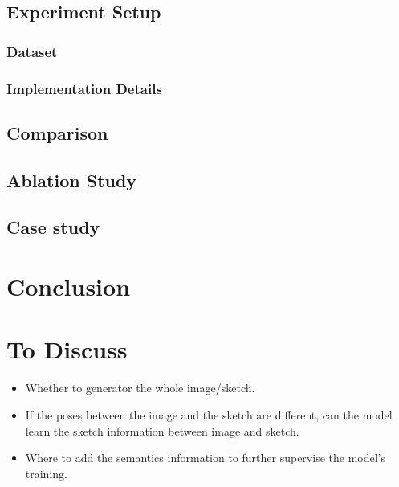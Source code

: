 \documentclass[10pt,twocolumn,letterpaper]{article}
\begin{document}
\subsection{Experiment Setup}

\subsubsection{Dataset}

\subsubsection{Implementation Details}

\subsection{Comparison}

\subsection{Ablation Study}

\subsection{Case study}

\section{Conclusion}

\section{To Discuss}
\begin{itemize}
	\item Whether to generator the whole image/sketch.
	\item If the poses between the image and the sketch are different, can the model learn the sketch information between image and sketch.
	\item Where to add the semantics information to further supervise the model's training.
\end{itemize}


{\small


}
\end{document}
